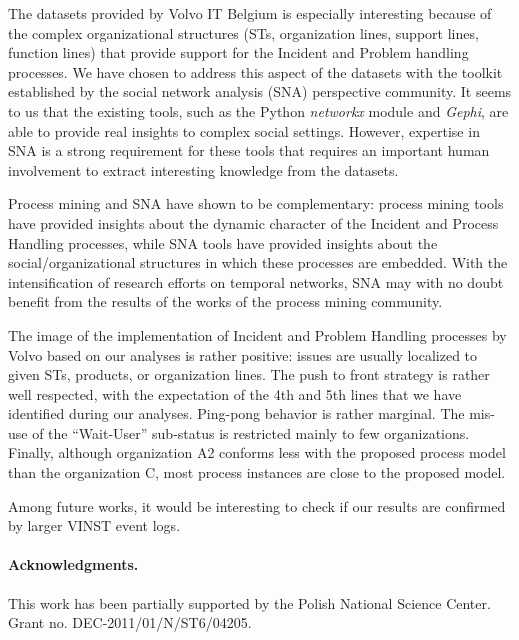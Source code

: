 \documentclass[lnbip]{svmultln}
\begin{document}
The datasets provided by Volvo IT Belgium is especially interesting because of the complex organizational structures (STs, organization lines, support lines, function lines) that provide support for the Incident and Problem handling processes. We have chosen to address this aspect of the datasets with the toolkit established by the social network analysis (SNA) perspective community. It seems to us that the existing tools, such as the Python \emph{networkx} module and \emph{Gephi}, are able to provide real insights to complex social settings. However, expertise in SNA is a strong requirement for these tools that requires an important human involvement to extract interesting knowledge from the datasets.

Process mining and SNA have shown to be complementary: process mining tools have provided insights about the dynamic character of the Incident and Process Handling processes, while 
SNA tools have provided insights about the social/organizational structures in which these processes are embedded. With the intensification of research efforts on temporal networks, SNA may with no doubt benefit from the results of the works of the process mining community. 

The image of the implementation of Incident and Problem Handling processes by Volvo based on our analyses is rather positive: issues are usually localized to given STs, products, or organization lines. The push to front strategy is rather well respected, with the expectation of the 4th and 5th lines that we have identified during our analyses. Ping-pong behavior is rather marginal. The mis-use of the ``Wait-User'' sub-status is restricted mainly to few organizations. Finally, although organization A2 conforms less with the proposed process model than the organization C, most process instances are close to the proposed model.

Among future works, it would be interesting to check if our results are confirmed by larger VINST event logs. 

\paragraph{Acknowledgments.}
This work has been partially supported by the Polish National Science Center. Grant no. DEC-2011/01/N/ST6/04205.



\end{document}
